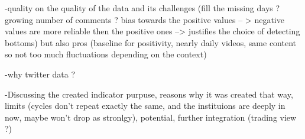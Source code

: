 -quality on the quality of the data and its challenges (fill the missing days ? growing number of comments ? bias towards the positive values
-- > negative values are more reliable then the positive ones --> justifies the choice of detecting bottoms)
but also pros (baseline for positivity, nearly daily videos, same content so not too much fluctuations depending on the context)

-why twitter data ? 

-Discussing the created indicator 
purpuse, reasons why it was created that way, limits (cycles don't repeat exactly the same, and the instituions are deeply in now, maybe won't drop
as stronlgy), potential, further integration (trading view ?)